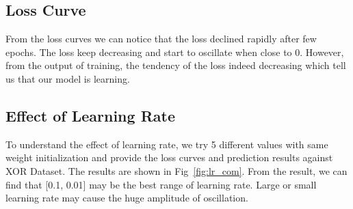 \documentclass[12pt,a4paper]{article}
\begin{document}
\subsection{Loss Curve}
From the loss curves we can notice that the loss declined rapidly after few epochs. The loss keep decreasing and start to oscillate when close to 0. However, from the output of training, the tendency of the loss indeed decreasing which tell us that our model is learning.
\subsection{Effect of Learning Rate}
To understand the effect of learning rate, we try 5 different values with same weight initialization and provide the loss curves and prediction results against XOR Dataset. The results are shown in Fig~\ref{fig:lr_com}. From the result, we can find that [0.1, 0.01] may be the best range of learning rate. Large or small learning rate may cause the huge amplitude of oscillation.
\end{document}

